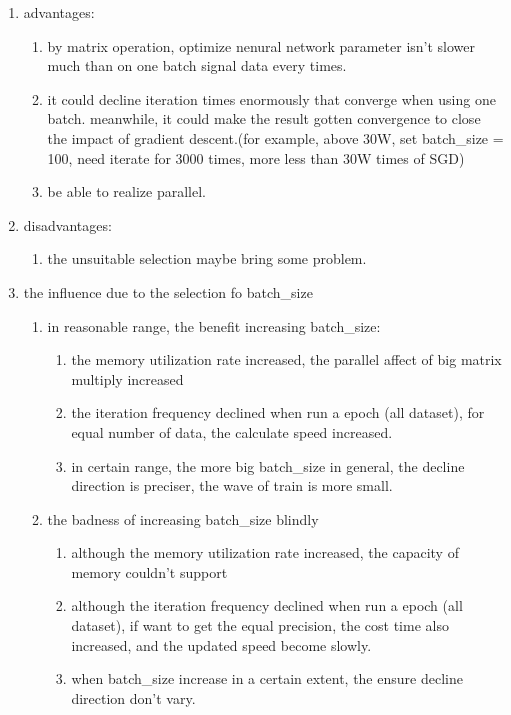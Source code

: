 \documentclass[12pt]{ctexart}%
\begin{document}
\begin{itemize}
\begin{enumerate}[(1)]
\begin{enumerate}
							\}
						\item advantages:
							\begin{enumerate}
								\item by matrix operation, optimize nenural network parameter isn't slower much than on one batch  signal data every times.
								\item it could decline iteration times enormously that converge when using one batch. meanwhile, it could make the result gotten convergence to close the impact of gradient descent.(for example, above 30W, set batch\_size = 100, need iterate for 3000 times, more less than 30W times of SGD)
								\item be able to realize parallel.
							\end{enumerate}
						\item disadvantages:
							\begin{enumerate}
								\item the unsuitable selection maybe bring some problem.
							\end{enumerate}
						\item the influence due to the selection fo batch\_size
							\begin{enumerate}[i]
								\item in reasonable range, the benefit increasing batch\_size:
									\begin{enumerate}[1)]
										\item the memory utilization rate increased, the parallel affect of big matrix multiply increased
										\item the iteration frequency declined when run a epoch (all dataset), for equal number of data, the calculate speed increased.
										\item in certain range, the more big batch\_size in general, the decline direction is preciser, the wave of train is more small.
									\end{enumerate}
								\item the badness of increasing batch\_size blindly
									\begin{enumerate}[1)]
										\item although the memory utilization rate increased, the capacity of memory couldn't support
										\item although the iteration frequency declined when run a epoch (all dataset), if want to get the equal precision, the cost time also increased, and the updated speed become slowly.
										\item when batch\_size increase in a certain extent, the ensure decline direction don't vary.
									\end{enumerate}
							\end{enumerate}
					\end{enumerate}
				

\end{enumerate}
\end{itemize}
\end{document}
